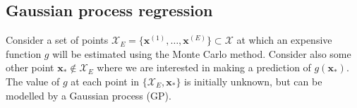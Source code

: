 \documentclass{article} %
\begin{document}

\subsection{Gaussian process regression}\label{sec:GP}



Consider a set of points $\mathcal{X}_{E} = \{ \textbf{x}^{(1)}, \ldots , \textbf{x}^{(E)} \} \subset \mathcal{X}$ at which an expensive function $g$ will be estimated using the Monte Carlo method. Consider also some other point $\mathbf{x}_{*} \not\in \mathcal{X}_{E}$ where we are interested in making a prediction of $g(\mathbf{x}_{*})$. The value of $g$ at each point in $\{\mathcal{X}_{E}, \mathbf{x}_{*}\}$ is initially unknown, but can be modelled by a Gaussian process (GP). 
\end{document}
